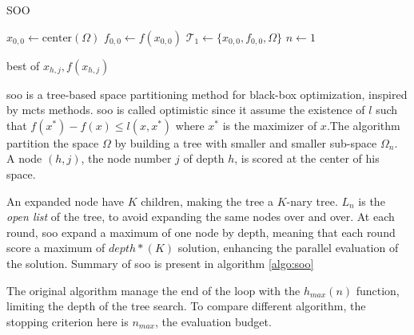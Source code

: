 \begin{algorithm}[h]
    \caption{SOO}
    \label{algo:soo}
    $x_{0,0} \gets \text{center}(\Omega)$ \;
    $f_{0,0} \gets f(x_{0,0})$ \;
    $\mathcal{T}_1 \gets \{x_{0,0}, f_{0,0}, \Omega\}$ \;
    $n \gets 1$ \;

    \Return best of $x_{h,j}, f(x_{h,j})$ \;
    \end{algorithm}
    

\acrshort{soo} is a tree-based space partitioning method for black-box optimization, inspired by \acrfull{mcts} methods. \acrshort{soo} is called optimistic since it assume the existence of $ l$ such that $f(x^*)-f(x) \leq l(x,x^*)$ where $x^*$ is the maximizer of $x$.The algorithm partition the space $\Omega$ by building a tree with smaller and smaller sub-space $\Omega_n$. A node $(h,j)$, the node number $j$ of depth $h$, is scored at the center of his space. 

An expanded node have $K$ children, making the tree a $K$-nary tree. $L_n$ is the \textit{open list} of the tree, to avoid expanding the same nodes over and over. At each round, \acrshort{soo} expand a maximum of one node by depth, meaning that each round score a maximum of $depth*(K)$ solution, enhancing the parallel evaluation of the solution. Summary of \acrshort{soo} is present in algorithm \ref{algo:soo}

The original algorithm manage the end of the loop with the $h_{max}(n)$ function, limiting the depth of the tree search. To compare different algorithm, the stopping criterion here is $n_{max}$, the evaluation budget. 

